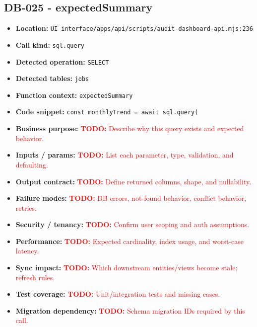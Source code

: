 \documentclass[11pt]{article}
\newcommand{\todoitem}[1]{\textcolor{red}{\textbf{TODO:} #1}}
\begin{document}
\subsection{DB-025 - expectedSummary}
\begin{itemize}[leftmargin=1.5em]
\item \textbf{Location:} \texttt{UI interface/apps/api/scripts/audit-dashboard-api.mjs:236}
\item \textbf{Call kind:} \texttt{sql.query}
\item \textbf{Detected operation:} \texttt{SELECT}
\item \textbf{Detected tables:} \texttt{jobs}
\item \textbf{Function context:} \texttt{expectedSummary}
\item \textbf{Code snippet:} \texttt{const monthlyTrend = await sql.query(}
\item \textbf{Business purpose:} \todoitem{Describe why this query exists and expected behavior.}
\item \textbf{Inputs / params:} \todoitem{List each parameter, type, validation, and defaulting.}
\item \textbf{Output contract:} \todoitem{Define returned columns, shape, and nullability.}
\item \textbf{Failure modes:} \todoitem{DB errors, not-found behavior, conflict behavior, retries.}
\item \textbf{Security / tenancy:} \todoitem{Confirm user scoping and auth assumptions.}
\item \textbf{Performance:} \todoitem{Expected cardinality, index usage, and worst-case latency.}
\item \textbf{Sync impact:} \todoitem{Which downstream entities/views become stale; refresh rules.}
\item \textbf{Test coverage:} \todoitem{Unit/integration tests and missing cases.}
\item \textbf{Migration dependency:} \todoitem{Schema migration IDs required by this call.}
\end{itemize}
\end{document}
